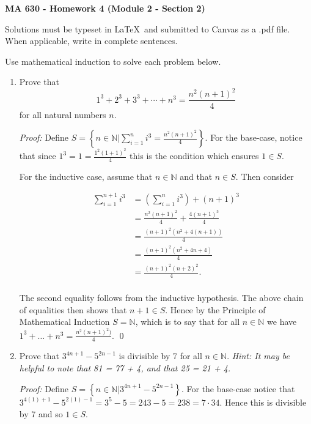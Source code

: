 \documentclass[12pt]{article}
\begin{document}
\pagestyle{empty}

 {\noindent \textbf{\large MA 630 - Homework 4 (Module 2 - Section 2)}
\vspace{.25in}

\noindent Solutions must be typeset in \LaTeX \ and submitted to Canvas as a .pdf file. When applicable, write in complete sentences.
\vspace{.25in}

Use mathematical induction to solve each problem below.

\begin{enumerate}


\item Prove that
\[1^3 + 2^3 + 3^3 + \dotsb + n^3 = \frac{n^2(n+1)^2}{4}\]
for all natural numbers $n$.

{\it Proof:} Define $S=\left\{n\in \mathbb N| \sum_{i=1}^n i^3 = \frac{n^2(n+1)^2}{4}\right\}.$  For the base-case, notice that since $1^3 = 1 = \frac{1^2(1+1)^2}{4}$ this is the condition which ensures $1\in S$.

For the inductive case, assume that $n\in\mathbb{N}$ and that $n\in S$.  Then consider

\begin{align*}
  \sum_{i=1}^{n+1} i^3 &= \left(\sum_{i=1}^n i^3\right)+(n+1)^3 \\[.3cm]
  &= \frac{n^2(n+1)^2}{4} + \frac{4(n+1)^3}{4} \\[.3cm]
  &= \frac{(n+1)^2(n^2+4(n+1))}{4} \\[.3cm]
  &= \frac{(n+1)^2(n^2+4n+4)}{4} \\[.3cm]
  &= \frac{(n+1)^2(n+2)^2}{4}. \\
\end{align*}

The second equality follows from the inductive hypothesis.  The above chain of equalities then shows that $n+1\in S$.  Hence by the Principle of Mathematical Induction $S=\mathbb N$, which is to say that for all $n\in \mathbb N$ we have $1^3+\dots+n^3 = \frac{n^2(n+1)^2)}{4}$. \qed

\item Prove that $3^{4n+1} - 5^{2n-1}$ is divisible by 7 for all $n \in \mathbb{N}$. \emph{Hint: It may be helpful to note that 81 = 77 + 4, and that 25 = 21 + 4.}

{\it Proof:} Define $S=\left\{n\in\mathbb{N}|3^{4n+1}-5^{2n-1}\right\}$.  For the base-case notice that $3^{4(1)+1}-5^{2(1)-1} = 3^5-5 = 243-5=238 = 7\cdot 34$.  Hence this is divisible by 7 and so $1\in S$.


\end{enumerate}}
\end{document}
